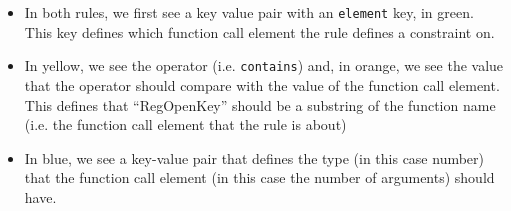 \begin{itemize}
  \item In both rules, we first see a key value pair with an \texttt{element} key, in green. This key defines which function call element the rule defines a constraint on.

  \item In yellow, we see the operator (i.e. \texttt{contains}) and, in orange, we see the value that the operator should compare with the value of the function call element. This defines that ``RegOpenKey'' should be a substring of the function name (i.e. the function call element that the rule is about)

  \item In blue, we see a key-value pair that defines the type (in this case number) that the function call element (in this case the number of arguments) should have.
\end{itemize}

